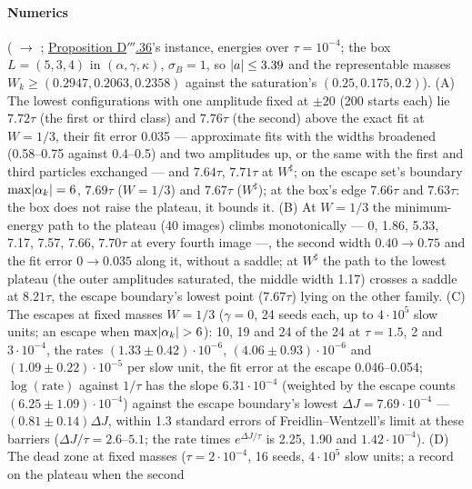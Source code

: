 \begin{sloppypar}
\paragraph{Numerics} ( $\to$ ;
\hyperref[res:thmDppp:36]{Proposition D$'''$.36}'s instance, energies over $\tau = 10^{-4}$; the box $L = (5, 3, 4)$ in
$(\alpha,\gamma,\kappa)$, $\sigma_B = 1$, so $\lvert a\rvert\le3.39$ and the representable masses
$W_k\ge(0.2947, 0.2063, 0.2358)$ against the saturation's $(0.25, 0.175, 0.2)$). (A) The lowest configurations with one
amplitude fixed at $\pm20$ (200 starts each) lie $7.72\tau$ (the first or third class) and $7.76\tau$ (the second) above
the exact fit at $W = 1/3$, their fit error 0.035 --- approximate fits with the widths broadened (0.58--0.75 against
0.4--0.5) and two amplitudes up, or the same with the first and third particles exchanged --- and $7.64\tau$,
$7.71\tau$ at $W^\sharp$; on the escape set's boundary $\max\lvert \alpha_k\rvert = 6$, $7.69\tau$ ($W = 1/3$) and $7.67\tau$
($W^\sharp$); at the box's edge $7.66\tau$ and $7.63\tau$: the box does not raise the plateau, it bounds it. (B) At
$W = 1/3$ the minimum-energy path to the plateau (40 images) climbs monotonically --- 0, 1.86, 5.33, 7.17, 7.57, 7.66,
$7.70\tau$ at every fourth image ---, the second width $0.40\to0.75$ and the fit error $0\to0.035$ along it, without a
saddle; at $W^\sharp$ the path to the lowest plateau (the outer amplitudes saturated, the middle width 1.17) crosses a
saddle at $8.21\tau$, the escape boundary's lowest point ($7.67\tau$) lying on the other family. (C) The escapes at
fixed masses $W = 1/3$ ($\gamma = 0$, 24 seeds each, up to $4\cdot10^5$ slow units; an escape when
$\max\lvert \alpha_k\rvert > 6$): 10, 19 and 24 of the 24 at $\tau = 1.5$, 2 and $3\cdot10^{-4}$, the rates
$(1.33\pm0.42)\cdot10^{-6}$, $(4.06\pm0.93)\cdot10^{-6}$ and $(1.09\pm0.22)\cdot10^{-5}$ per slow unit, the fit error
at the escape 0.046--0.054; $\log(\text{rate})$ against $1/\tau$ has the slope $6.31\cdot10^{-4}$ (weighted by the
escape counts $(6.25\pm1.09)\cdot10^{-4}$) against the escape boundary's lowest $\Delta J = 7.69\cdot10^{-4}$ ---
$(0.81\pm0.14)\Delta J$, within 1.3 standard errors of Freidlin--Wentzell's limit at these barriers
($\Delta J/\tau = 2.6$--$5.1$; the rate times $e^{\Delta J/\tau}$ is 2.25, 1.90 and $1.42\cdot10^{-4}$). (D) The dead
zone at fixed masses ($\tau = 2\cdot10^{-4}$, 16 seeds, $4\cdot10^5$ slow units; a record on the plateau when the second

\end{sloppypar}
